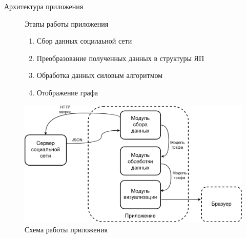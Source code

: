 \documentclass{beamer}
\begin{document}
\begin{frame}{Архитектура приложения }

	\begin{figure}
		\begin{minipage}{0.5\textwidth}
			\begin{alertblock}{Этапы работы приложения}
				\begin{enumerate}
					\item Сбор данных социлаьной сети
					\item Преобразование полученных данных в структуры ЯП
					\item Обработка данных силовым алгоритмом
					\item Отображение графа
				\end{enumerate}
			\end{alertblock}
		\end{minipage}
		\hfill
		\begin{minipage}{0.47\textwidth}
			\centering
			\includegraphics[width=\linewidth]{./imgs/app_scheme.png}
			\caption{Схема работы приложения}
		\end{minipage}
	\end{figure}

\end{frame}
\end{document}
